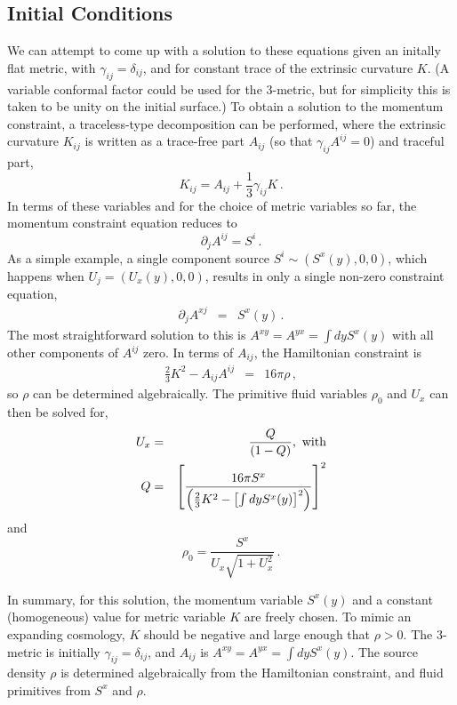 \documentclass[english]{article}
\begin{document}
\subsection{Initial Conditions}

We can attempt to come up with a solution to these equations given
an initally flat metric, with $\gamma_{ij}=\delta_{ij}$, and for
constant trace of the extrinsic curvature $K$. (A variable conformal
factor could be used for the 3-metric, but for simplicity this is
taken to be unity on the initial surface.) To obtain a solution to
the momentum constraint, a traceless-type decomposition can be performed,
where the extrinsic curvature $K_{ij}$ is written as a trace-free
part $A_{ij}$ (so that $\gamma_{ij}A^{ij}=0$) and traceful part,
\begin{equation}
K_{ij}=A_{ij}+\frac{1}{3}\gamma_{ij}K\,.
\end{equation}
In terms of these variables and for the choice of metric variables
so far, the momentum constraint equation reduces to
\begin{equation}
\partial_{j}A^{ij}=S^{i}\,.
\end{equation}
As a simple example, a single component source $S^{i}\sim(S^{x}(y),0,0)$,
which happens when $U_{j}=(U_{x}(y),0,0)$, results in only a single
non-zero constraint equation, 
\begin{eqnarray}
\partial_{j}A^{xj} & = & S^{x}(y)\,.
\end{eqnarray}
The most straightforward solution to this is $A^{xy}=A^{yx}=\int dyS^{x}(y)$
with all other components of $A^{ij}$ zero. In terms of $A_{ij}$,
the Hamiltonian constraint is 
\begin{eqnarray}
\frac{2}{3}K^{2}-A_{ij}A^{ij} & = & 16\pi\rho\,,
\end{eqnarray}
so $\rho$ can be determined algebraically. The primitive fluid variables
$\rho_{0}$ and $U_{x}$ can then be solved for,
\begin{eqnarray}
U_{x} & = & \frac{Q}{(1-Q)},\,\,{\rm with}\\
Q & = & \left[\frac{16\pi S^{x}}{\left(\frac{2}{3}K^{2}-\left[\int dyS^{x}(y)\right]^{2}\right)}\right]^{2}
\end{eqnarray}
and
\begin{equation}
\rho_{0}=\frac{S^{x}}{U_{x}\sqrt{1+U_{x}^{2}}}\,.
\end{equation}

In summary, for this solution, the momentum variable $S^{x}(y)$ and a
constant (homogeneous) value for metric variable $K$ are freely chosen.
To mimic an expanding cosmology, $K$ should be negative and large enough
that $\rho>0$. The 3-metric is initially $\gamma_{ij}=\delta_{ij}$, and
$A_{ij}$ is $A^{xy}=A^{yx}=\int dyS^{x}(y)$. The source density $\rho$
is determined algebraically from the Hamiltonian constraint, and fluid
primitives from $S^{x}$ and $\rho$.
\end{document}
